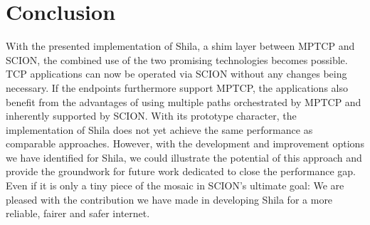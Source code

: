 \chapter{Conclusion}
\label{chap:Conclusion}

With the presented implementation of Shila, a shim layer between MPTCP and SCION, the combined use of the two promising technologies becomes possible. TCP applications can now be operated via SCION without any changes being necessary. If the endpoints furthermore support MPTCP, the applications also benefit from the advantages of using multiple paths orchestrated by MPTCP and inherently supported by SCION. With its prototype character, the implementation of Shila does not yet achieve the same performance as comparable approaches. However, with the development and improvement options we have identified for Shila, we could illustrate the potential of this approach and provide the groundwork for future work dedicated to close the performance gap. Even if it is only a tiny piece of the mosaic in SCION's ultimate goal: We are pleased with the contribution we have made in developing Shila for a more reliable, fairer and safer internet.